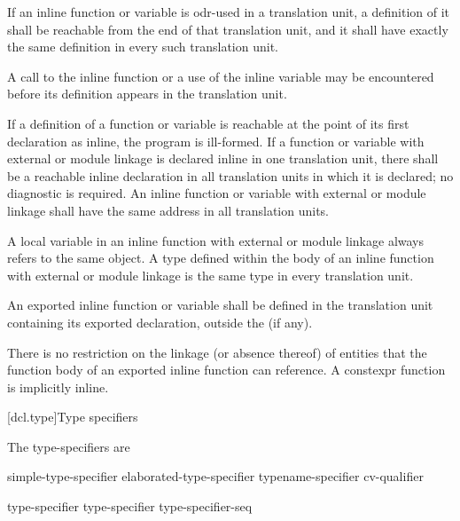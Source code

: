 \pnum
If an inline function or variable
is odr-used in a translation unit,
a definition of it shall be reachable from the end of that translation unit,
and it shall have exactly the same definition
in every such translation unit.
\begin{note}
A call to the inline function or a use of the inline variable may be encountered before its definition
appears in the translation unit.
\end{note}
If a definition of a function or variable is reachable
at the point of its
first declaration as inline, the program is ill-formed. If a function or variable
with external or module linkage
is declared inline in one translation unit,
there shall be a reachable inline declaration
in all translation units in which it is declared;
no diagnostic is required.
An inline function or variable
with external or module linkage
shall have the same address in all translation units.
\begin{note}
A  local variable in an inline
function with external or module linkage
always refers to the same object.
A type defined within the body of an inline
function with external or module linkage is the
same type in every translation unit.
\end{note}

\pnum
An exported inline function or variable
shall be defined in the translation unit
containing its exported declaration,
outside the  (if any).
\begin{note}
There is no restriction on the linkage (or absence thereof)
of entities that the function body of an exported inline function
can reference. A constexpr function is implicitly inline.
\end{note}

[dcl.type]{Type specifiers}%

\pnum
The type-specifiers are
%
%
%
\begin{bnf}
\br
  simple-type-specifier\br
  elaborated-type-specifier\br
  typename-specifier\br
  cv-qualifier
\end{bnf}

\begin{bnf}
\br
    type-specifier \br
    type-specifier type-specifier-seq
\end{bnf}

